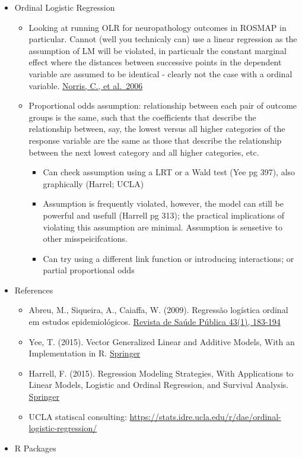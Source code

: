 \documentclass[]{book}
\providecommand{\tightlist}{%
  \setlength{\itemsep}{0pt}\setlength{\parskip}{0pt}}
\begin{document}
\begin{itemize}
\tightlist
\item
  Ordinal Logistic Regression

  \begin{itemize}
  \tightlist
  \item
    Looking at running OLR for neuropathology outcomes in ROSMAP in particular. Cannot (well you technicaly can) use a linear regression as the assumption of LM will be violated, in particualr the constant marginal effect where the distances between successive points in the dependent variable are assumed to be identical - clearly not the case with a ordinal variable. \href{https://dx.doi.org/10.1016/j.jclinepi.2005.09.007}{Norris, C., et al.~2006}
  \item
    Proportional odds assumption: relationship between each pair of outcome groups is the same, such that the coefficients that describe the relationship between, say, the lowest versus all higher categories of the response variable are the same as those that describe the relationship between the next lowest category and all higher categories, etc.

    \begin{itemize}
    \tightlist
    \item
      Can check assumption using a LRT or a Wald test (Yee pg 397), also graphically (Harrel; UCLA)
    \item
      Assumption is frequently violated, however, the model can still be powerful and usefull (Harrell pg 313); the practical
      implications of violating this assumption are minimal. Assumption is sensetive to other misspeicifcations.
    \item
      Can try using a different link function or introducing interactions; or partial proportional odds
    \end{itemize}
  \end{itemize}
\item
  References

  \begin{itemize}
  \tightlist
  \item
    Abreu, M., Siqueira, A., Caiaffa, W. (2009). Regressão logística ordinal em estudos epidemiológicos. \href{https://dx.doi.org/10.1590/s0034-89102009000100025}{Revista de Saúde Pública 43(1), 183-194}
  \item
    Yee, T. (2015). Vector Generalized Linear and Additive Models, With an Implementation in R. \href{https://dx.doi.org/10.1007/978-1-4939-2818-7}{Springer}
  \item
    Harrell, F. (2015). Regression Modeling Strategies, With Applications to Linear Models, Logistic and Ordinal Regression, and Survival Analysis. \href{https://dx.doi.org/10.1007/978-3-319-19425-7}{Springer}
  \item
    UCLA statiscal consulting: \url{https://stats.idre.ucla.edu/r/dae/ordinal-logistic-regression/}
  \end{itemize}
\item
  R Packages


\end{itemize}
\end{document}
